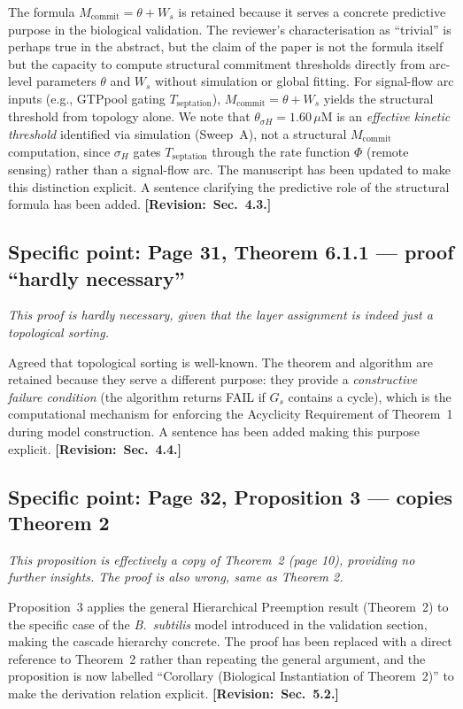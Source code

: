 \documentclass[11pt,letterpaper]{article}
\newcommand{\rquote}[1]{\begin{mdframed}[style=reviewquote]\textit{#1}\end{mdframed}}
\newcommand{\sref}[1]{\textbf{[Revision:~#1]}}
\begin{document}
The formula $M_{\mathrm{commit}} = \theta + W_s$ is retained because it
serves a concrete predictive purpose in the biological validation.
The reviewer's characterisation as ``trivial'' is perhaps true in the abstract,
but the claim of the paper is not the formula itself but the capacity to
compute structural commitment thresholds directly from arc-level parameters
$\theta$ and $W_s$ without simulation or global fitting.
For signal-flow arc inputs (e.g., GTP\textunderscore pool gating $T_{\mathrm{septation}}$),
$M_{\mathrm{commit}} = \theta + W_s$ yields the structural threshold from
topology alone.
We note that $\theta_{\sigma H} = 1.60\,\mu$M is an \emph{effective kinetic
threshold} identified via simulation (Sweep~A), not a structural
$M_{\mathrm{commit}}$ computation, since $\sigma_H$ gates $T_{\mathrm{septation}}$
through the rate function $\Phi$ (remote sensing) rather than a signal-flow arc.
The manuscript has been updated to make this distinction explicit.
A sentence clarifying the predictive role of the structural formula has been
added. \sref{Sec.~4.3.}

\subsection*{Specific point: Page 31, Theorem 6.1.1 --- proof ``hardly necessary''}

\rquote{This proof is hardly necessary, given that the layer assignment is
indeed just a topological sorting.}

Agreed that topological sorting is well-known.
The theorem and algorithm are retained because they serve a different
purpose: they provide a \emph{constructive failure condition} (the algorithm
returns FAIL if $G_s$ contains a cycle), which is the computational
mechanism for enforcing the Acyclicity Requirement of Theorem~1 during
model construction.
A sentence has been added making this purpose explicit. \sref{Sec.~4.4.}

\subsection*{Specific point: Page 32, Proposition 3 --- copies Theorem 2}

\rquote{This proposition is effectively a copy of Theorem~2 (page 10),
providing no further insights. The proof is also wrong, same as Theorem 2.}

Proposition~3 applies the general Hierarchical Preemption result
(Theorem~2) to the specific case of the \textit{B.\ subtilis} model
introduced in the validation section, making the cascade hierarchy concrete.
The proof has been replaced with a direct reference to Theorem~2 rather than
repeating the general argument, and the proposition is now labelled
``Corollary (Biological Instantiation of Theorem~2)'' to make the derivation
relation explicit. \sref{Sec.~5.2.}
\end{document}
